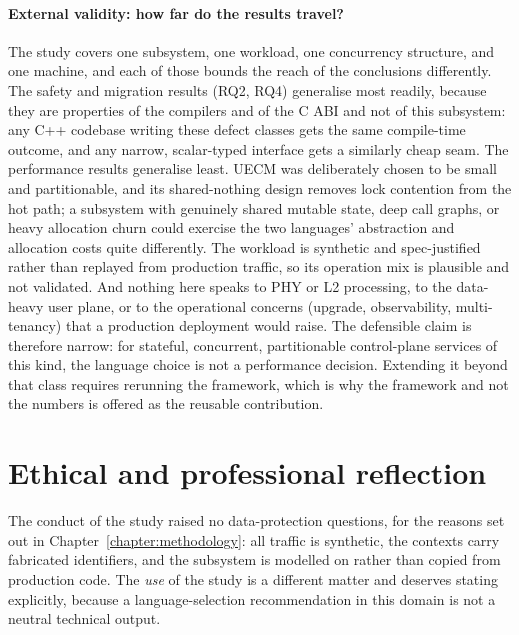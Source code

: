 \documentclass[english,twoside,openright,a4paper,censored,csm,software-track-2020]{HYthesisML}
\begin{document}
\paragraph{External validity: how far do the results travel?}
The study covers one subsystem, one workload, one concurrency structure, and one machine, and
each of those bounds the reach of the conclusions differently. The safety and migration
results (RQ2, RQ4) generalise most readily, because they are properties of the compilers and
of the C ABI and not of this subsystem: any C++ codebase writing these defect classes gets
the same compile-time outcome, and any narrow, scalar-typed interface gets a similarly cheap
seam. The performance results generalise least. UECM was deliberately chosen to be small and
partitionable, and its shared-nothing design removes lock contention from the hot path;
a subsystem with genuinely shared mutable state, deep call graphs, or heavy allocation
churn could exercise the two languages' abstraction and allocation costs quite differently. The
workload is synthetic and spec-justified rather than replayed from production traffic, so its
operation mix is plausible and not validated. And nothing here speaks to PHY or L2
processing, to the data-heavy user plane, or to the operational concerns (upgrade,
observability, multi-tenancy) that a production deployment would raise. The defensible claim
is therefore narrow: for stateful, concurrent, partitionable control-plane services of this
kind, the language choice is not a performance decision. Extending it beyond that class
requires rerunning the framework, which is why the framework and not the numbers is
offered as the reusable contribution.

\section{Ethical and professional reflection}
The conduct of the study raised no data-protection questions, for the reasons set out in
Chapter~\ref{chapter:methodology}: all traffic is synthetic, the contexts carry fabricated
identifiers, and the subsystem is modelled on rather than copied from production code. The
\emph{use} of the study is a different matter and deserves stating explicitly, because a
language-selection recommendation in this domain is not a neutral technical output.
\end{document}

